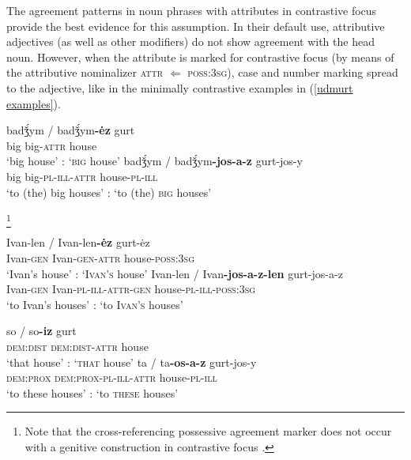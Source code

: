 The agreement patterns in noun phrases with attributes in contrastive focus provide the best evidence for this assumption. In their default use, attributive adjectives (as well as other modifiers) do not show agreement with the head noun. However, when the attribute is marked for contrastive focus (by means of the attributive nominalizer \textsc{attr} $\Leftarrow$ \textsc{poss:3sg}), case and number marking spread to the adjective, like in the minimally contrastive examples in (\ref{udmurt examples}).
\begin{exe}
\label{udmurt examples}
\begin{xlist}
\begin{xlist}
\ex 	
\gll	badǯ́ym / badǯ́ym\textbf{-ėz} gurt\\
	big {} big-\textsc{attr} house\\
\glt	‘big house’ : ‘\textsc{big} house’
\ex	
\gll	badǯ́ym / badǯ́ym\textbf{-jos-a-z} gurt-jos-y\\
	big {} big-\textsc{pl}-\textsc{ill}-\textsc{attr} house-\textsc{pl}-\textsc{ill}\\
\glt	‘to (the) big houses’ : ‘to (the) \textsc{big} houses’
\end{xlist}
\footnote{Note that the cross-referencing possessive agreement marker does not occur with a genitive construction in contrastive focus \citep[81]{kelmakov-etal1999}.}
\begin{xlist}
\ex	
\gll	Ivan-len / Ivan-len\textbf{-ėz} gurt-ėz\\
	Ivan-\textsc{gen} {} Ivan-\textsc{gen}-\textsc{attr} house-\textsc{poss:3sg}\\
\glt	‘Ivan's house’ : ‘\textsc{Ivan's} house’
\ex	
\gll	Ivan-len / Ivan\textbf{-jos-a-z-len} gurt-jos-a-z\\
	Ivan-\textsc{gen} {} Ivan-\textsc{pl}-\textsc{ill}-\textsc{attr}-\textsc{gen} house-\textsc{pl}-\textsc{ill}-\textsc{poss:3sg}\\
\glt	‘to Ivan's houses’ : ‘to \textsc{Ivan's} houses’
\end{xlist}
\label{udmurt det dem}
\begin{xlist}
\ex	
\gll	so / so\textbf{-iz} gurt\\
 	\textsc{dem:dist} {} \textsc{dem:dist}-\textsc{attr} house\\
\glt	‘that house’ : ‘\textsc{that} house’
\ex 	
\gll	ta / ta\textbf{-os-a-z} gurt-jos-y\\
	\textsc{dem:prox} {} \textsc{dem:prox}-\textsc{pl}-\textsc{ill}-\textsc{attr} house-\textsc{pl}-\textsc{ill}\\
\glt	 ‘to these houses’ : ‘to \textsc{these} houses’
\end{xlist}
\end{xlist}
\end{exe}

